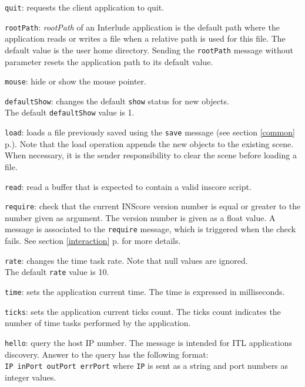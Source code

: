 \documentclass[a4paper,twoside]{report}
\newcommand{\fullref}[1]	{\ref{#1} p.\pageref{#1}}
\newcommand{\OSC}[1]		{\texttt{#1}}
\newcommand{\oldexample}	{\hspace*{1cm}}
\let\olditemize\itemize
\let\oldenditemize\enditemize
\renewenvironment{itemize} 	{\olditemize \setlength{\itemsep}{1mm}}{\oldenditemize}
\begin{document}
\begin{itemize}
\item \OSC{quit}: requests the client application to quit.

\item \OSC{rootPath}: \emph{rootPath} of an Interlude application is the default path where the application reads or writes a file when a relative path is used for this file. The default value is the user home directory. Sending the \OSC{rootPath} message without parameter resets the application path to its default value.

\item \OSC{mouse}: hide or show the mouse pointer.

\item \OSC{defaultShow}: changes the default \OSC{show} status for new objects. \\
The default \OSC{defaultShow} value is 1.

\item \OSC{load}: loads a file previously saved using the \OSC{save} message (see section \fullref{common}). Note that the load operation appends the new objects to the existing scene. When necessary, it is the sender responsibility to clear the scene before loading a file.

\item \OSC{read}: read a buffer that is expected to contain a valid inscore script.

\item \OSC{require}: check that the current INScore version number is equal or greater to the number given as argument. The version number is given as a float value. A message is associated to the \OSC{require} message, which is triggered when the check fails. See section \fullref{interaction} for more details.

\item \OSC{rate}: changes the time task rate. Note that null values are ignored.\\
The default \OSC{rate} value is 10.

\item \OSC{time}: sets the application current time. The time is expressed in milliseconds.

\item \OSC{ticks}: sets the application current ticks count. The ticks count indicates the number of time tasks performed by the application.

\item \OSC{hello}: query the host IP number. The message is intended for ITL applications discovery. Answer to the query has the following format: \\
\oldexample \OSC{IP  inPort outPort errPort} where \OSC{IP} is sent as a string and port numbers as integer values.

\end{itemize}
\end{document}
